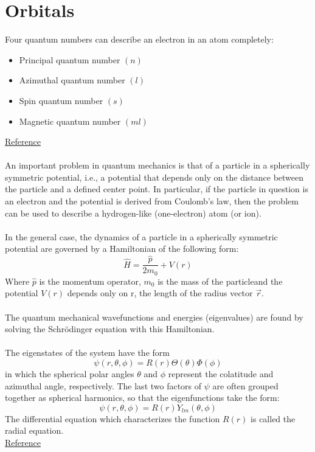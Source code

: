 \documentclass[12pt]{extarticle}
\theoremstyle{Definition}
\begin{document}
\section{Orbitals}
Four quantum numbers can describe an electron in an atom completely:
\begin{itemize}
	\item Principal quantum number $(n)$
	\item Azimuthal quantum number $(l)$
	\item Spin quantum number $(s)$
	\item Magnetic quantum number $(ml)$
\end{itemize}
\href{https://en.wikipedia.org/wiki/Quantum_number}{Reference} \\ \\
\noindent
An important problem in quantum mechanics is that of a particle in a spherically symmetric potential, i.e., a potential that depends only on the distance between the particle and a defined center point. In particular, if the particle in question is an electron and the potential is derived from Coulomb's law, then the problem can be used to describe a hydrogen-like (one-electron) atom (or ion).
 \\ \\
In the general case, the dynamics of a particle in a spherically symmetric potential are governed by a Hamiltonian of the following form: 
$$\hat{H} = \frac{\hat{p}}{2m_0} + V(r)$$
Where $\hat{p}$ is the momentum operator, $m_0$ is the mass of the particleand the potential $V(r)$ depends only on  r, the length of the radius vector $\vec{r}$.  \\ \\
The quantum mechanical wavefunctions and energies (eigenvalues) are found by solving the Schrödinger equation with this Hamiltonian. \\ \\
The eigenstates of the system have the form
$$\psi (r,\theta ,\phi )=R(r)\Theta (\theta )\Phi (\phi )$$
in which the spherical polar angles $\theta$ and $\phi$ represent the colatitude and azimuthal angle, respectively. The last two factors of $\psi$ are often grouped together as spherical harmonics, so that the eigenfunctions take the form: 
$$\psi (r,\theta ,\phi )=R(r)Y_{lm}(\theta ,\phi )$$
The differential equation which characterizes the function $R(r)$ is called the radial equation. \\
\href{https://en.wikipedia.org/wiki/Particle_in_a_spherically_symmetric_potential}{Reference} \\ \\
\end{document}
